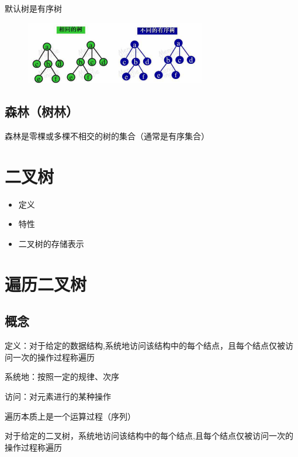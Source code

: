 \documentclass[AutoFakeBold]{LZUThesis2007}
\begin{document}
		默认树是有序树


\begin{figure}[H]
    \centering
    \includegraphics[width=0.7\textwidth]{figures/7.1.png}

\end{figure}

		\subsection{森林（树林）}
		森林是零棵或多棵不相交的树的集合（通常是有序集合）

	\section{二叉树}
		\begin{itemize}
			\item 定义
			\item 特性
			\item 二叉树的存储表示
		\end{itemize}

	\section{遍历二叉树}
		\subsection{概念}
		定义：对于给定的数据结构,系统地访问该结构中的每个结点，且每个结点仅被访问一次的操作过程称遍历

		系统地：按照一定的规律、次序

		访问：对元素进行的某种操作

		遍历本质上是一个运算过程（序列）

		对于给定的二叉树，系统地访问该结构中的每个结点,且每个结点仅被访问一次的操作过程称遍历
\end{document}
